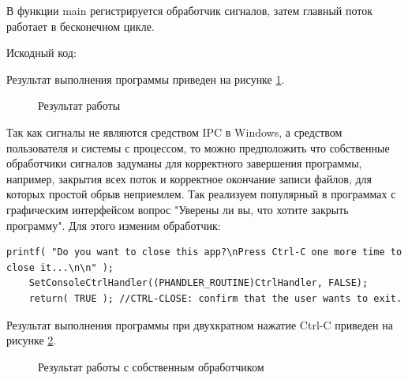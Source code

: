 \documentclass[a4paper]{article}
\begin{document}
	В функции main регистрируется обработчик сигналов, затем главный поток работает в бесконечном цикле.
	
	Искодный код:
	
	
	Результат выполнения программы приведен на рисунке \ref{img:task7}.
	\begin{figure}[h!]
		\caption{Результат работы}
		\label{img:task7}
	\end{figure}
	Так как сигналы не являются средством IPC в Windows, а средством пользователя и системы с процессом, то можно предположить что собственные обработчики сигналов задуманы для корректного завершения программы, например, закрытия всех поток и корректное окончание записи файлов, для которых простой обрыв неприемлем. Так реализуем популярный в программах с графическим интерфейсом вопрос "Уверены ли вы, что хотите закрыть программу". Для этого изменим обработчик:
	\begin{lstlisting}[style=crs_cpp]
	printf( "Do you want to close this app?\nPress Ctrl-C one more time to close it...\n\n" );
	SetConsoleCtrlHandler((PHANDLER_ROUTINE)CtrlHandler, FALSE);
	return( TRUE ); //CTRL-CLOSE: confirm that the user wants to exit. \end{lstlisting}

	Результат выполнения программы при двухкратном нажатие Ctrl-C приведен на рисунке \ref{img:task7_1}.
	\begin{figure}[h!]
		\caption{Результат работы с собственным обработчиком}
		\label{img:task7_1}
	\end{figure}
	
\end{document}
